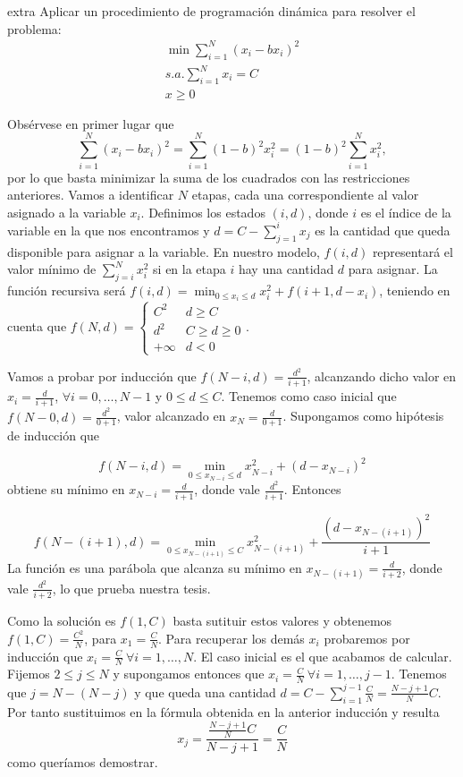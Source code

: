 \documentclass[twoside]{article}
\begin{document}
\begin{ejercicio}{extra}
Aplicar un procedimiento de programación dinámica para resolver el problema:
\begin{align*}
\min\sum_{i=1}^N (x_i-bx_i)^2\\
s.a. \sum_{i=1}^N x_i=C\\
x\geq 0
\end{align*}
\end{ejercicio}
\begin{solucion}
Obsérvese en primer lugar que $$\sum_{i=1}^N (x_i-bx_i)^2=\sum_{i=1}^N (1-b)^2x_i^2=(1-b)^2\sum_{i=1}^N x_i^2,$$ por lo que basta minimizar la suma de los cuadrados con las restricciones anteriores. Vamos a identificar $N$ etapas, cada una correspondiente al valor asignado a la variable $x_i$. Definimos los estados $(i,d)$, donde $i$ es el índice de la variable en la que nos encontramos y $d=C-\sum_{j=1}^i x_j$ es la cantidad que queda disponible para asignar a la variable. En nuestro modelo, $f(i,d)$ representará el valor mínimo de $\sum_{j=i}^N x_i^2$ si en la etapa $i$ hay una cantidad $d$ para asignar. La función recursiva será $f(i,d)=\min_{0\leq x_i\leq d}  x_i^2+f(i+1,d-x_i)$, teniendo en cuenta que $f(N,d)=\begin{cases}
C^2 & d\geq C\\
d^2 & C\geq d\geq 0\\
+\infty & d<0
\end{cases}$. 

Vamos a probar por inducción que $f(N-i,d)=\frac{d^2}{i+1}$, alcanzando dicho valor en $x_i=\frac{d}{i+1}$, $\forall i=0,\dots, N-1$ y $0\leq d\leq C$. Tenemos como caso inicial que $f(N-0,d)=\frac{d^2}{0+1}$, valor alcanzado en $x_N=\frac{d}{0+1}$. Supongamos como hipótesis de inducción que

$$f(N-i,d)=\min_{0\leq x_{N-i}\leq d}x_{N-i}^2+(d-x_{N-i})^2$$
obtiene su mínimo en $x_{N-i}=\frac{d}{i+1}$, donde vale $\frac{d^2}{i+1}$. Entonces

$$f(N-(i+1),d)=\min_{0\leq x_{N-(i+1)}\leq C}x_{N-(i+1)}^2+\frac{(d-x_{N-(i+1)})^2}{i+1}$$
La función es una parábola que alcanza su mínimo en $x_{N-(i+1)}=\frac{d}{i+2}$, donde vale $\frac{d^2}{i+2}$, lo que prueba nuestra tesis.

Como la solución es $f(1,C)$ basta sutituir estos valores y obtenemos $f(1,C)=\frac{C^2}{N}$, para $x_1=\frac{C}{N}$. Para recuperar los demás $x_i$ probaremos por inducción que $x_i=\frac{C}{N}\ \forall i=1,\dots,N$. El caso inicial es el que acabamos de calcular. Fijemos $2\leq j\leq N$ y supongamos entonces que $x_i=\frac{C}{N}\ \forall i=1,\dots,j-1$. Tenemos que $j=N-(N-j)$ y que queda una cantidad $d=C-\sum_{i=1}^{j-1}\frac{C}{N}=\frac{N-j+1}{N}C$. Por tanto sustituimos en la fórmula obtenida en la anterior inducción y resulta
$$x_j=\frac{\frac{N-j+1}{N}C}{N-j+1}=\frac{C}{N}$$
como queríamos demostrar.
\end{solucion}
\end{document}

